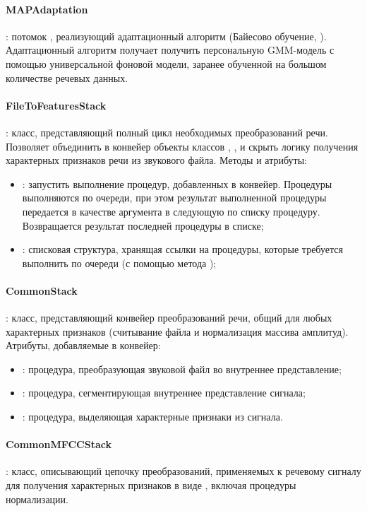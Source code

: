\paragraph{MAPAdaptation}: потомок , реализующий адаптационный алгоритм (Байесово обучение, ). Адаптационный алгоритм получает получить персональную GMM-модель с помощью универсальной фоновой модели, заранее обученной на большом количестве речевых данных.

\paragraph{FileToFeaturesStack}: класс, представляющий полный цикл необходимых преобразований речи. Позволяет объединить в конвейер объекты классов , ,  и скрыть логику получения характерных признаков речи из звукового файла. Методы и атрибуты:
\begin{itemize}
\item {}: запустить выполнение процедур, добавленных в конвейер. Процедуры выполняются по очереди, при этом результат выполненной процедуры передается в качестве аргумента в следующую по списку процедуру. Возвращается результат последней процедуры в списке;
\item {}: списковая структура, хранящая ссылки на процедуры, которые требуется выполнить по очереди (с помощью метода );
\end{itemize}

\paragraph{CommonStack}: класс, представляющий конвейер преобразований речи, общий для любых характерных признаков (считывание файла и нормализация массива амплитуд). Атрибуты, добавляемые в конвейер:
\begin{itemize}
\item {}: процедура, преобразующая звуковой файл во внутреннее представление;
\item {}: процедура, сегментирующая внутреннее представление сигнала;
\item {}: процедура, выделяющая характерные признаки из сигнала.
\end{itemize}

\paragraph{CommonMFCCStack}: класс, описывающий цепочку преобразований, применяемых к речевому сигналу для получения характерных признаков в виде , включая процедуры нормализации.


